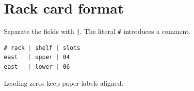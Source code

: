 \documentclass{article}
\begin{document}
\section*{Rack card format}

Separate the fields with \verb!|!. The literal \verb|#| introduces a comment.
\begin{verbatim}
# rack | shelf | slots
east   | upper | 04
east   | lower | 06
\end{verbatim}
Leading zeros keep paper labels aligned.
\end{document}
